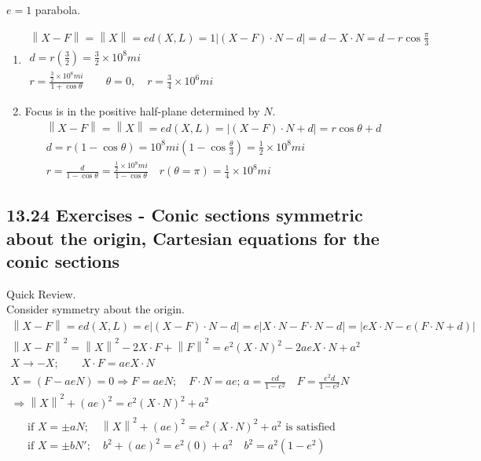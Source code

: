 \documentclass[twoside]{amsart}
\theoremstyle{plain}
\theoremstyle{definition}
\newcommand{\exercisehead}[1]
  {\smallskip
   \noindent{\small\bf Exercise #1.}}
\begin{document}
\exercisehead{13} $e=1$ parabola.  
\begin{enumerate}
\item 
\[
\begin{gathered}
  \left\| X - F \right\| = \left\| X \right\| = ed(X,L) = 1 | (X-F) \cdot N - d | = d - X\cdot N = d -r\cos{\frac{\pi}{3}} \\
  d = r \left( \frac{3}{2} \right) = \frac{3}{2} \times 10^8 mi \\
  \boxed{ r = \frac{ \frac{3}{2} \times 10^8 mi }{ 1 + \cos{\theta}} } \quad \quad \theta = 0, \quad r = \frac{3}{4} \times 10^6 mi
\end{gathered}
\]
\item Focus is in the positive half-plane determined by $N$.  
\[
\begin{gathered}
  \left\| X - F \right\| = \left\| X \right\| = e d(X,L) = | (X-F)\cdot N + d | = r\cos{\theta} + d \\
  d = r(1-\cos{\theta}) = 10^8 mi (1-\cos{\frac{\theta}{3} } ) = \frac{1}{2} \times 10^8 mi \\
  \boxed{ r = \frac{d}{1-\cos{\theta}} = \frac{ \frac{1}{2} \times 10^8 mi }{ 1 - \cos{\theta}} } \quad \boxed{ r(\theta= \pi ) = \frac{1}{4} \times 10^8 mi }
\end{gathered}
\]
\end{enumerate}

\subsection*{ 13.24 Exercises - Conic sections symmetric about the origin, Cartesian equations for the conic sections }
\quad 

Quick Review.\bigskip \\
Consider symmetry about the origin.  
\[
\begin{gathered}
  \left\| X - F \right\| = e d(X,L) = e | (X-F) \cdot N - d | = e|X\cdot N - F \cdot N - d| = |eX \cdot N - e (F \cdot N +d ) | \\
  \left\| X -F \right\|^2 = \left\| X \right\|^2 - 2 X \cdot F + \left\| F \right\|^2 = e^2 (X \cdot N)^2 - 2ae X \cdot N + a^2 \\
  X \to -X ; \quad \quad X \cdot F = aeX \cdot N \\
  X = (F-aeN) = 0 \Longrightarrow F =aeN; \quad F \cdot N = ae; \, a = \frac{ed}{1-e^2} \quad F = \frac{e^2 d}{ 1-e^2} N \\
\Longrightarrow \left\| X \right\|^2 + (ae)^2 = e^2(X \cdot N)^2 + a^2 \\
\begin{aligned}
  & \text{ if } X = \pm a N; \quad \left\| X \right\|^2 + (ae)^2 = e^2(X \cdot N)^2 + a^2 \text{ is satisfied } \\
  & \text{ if } X = \pm b N'; \quad b^2 + (ae)^2 = e^2(0) + a^2 \quad b^2 = a^2 (1-e^2)
\end{aligned}
\end{gathered}
\]
\end{document}
